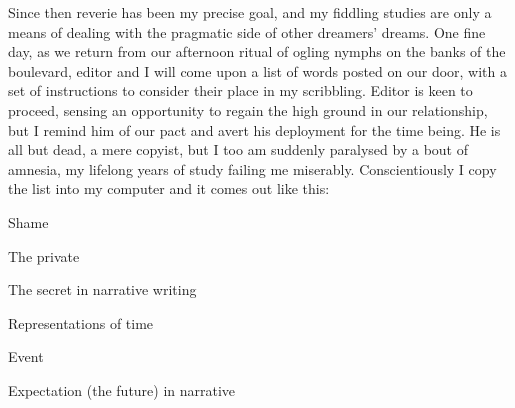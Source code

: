 \documentclass[
]{memoir}
\begin{document}
Since then reverie has been my precise goal, and my fiddling studies are
only a means of dealing with the pragmatic side of other dreamers'
dreams. One fine day, as we return from our afternoon ritual of ogling
nymphs on the banks of the boulevard, editor and I will come upon a list
of words posted on our door, with a set of instructions to consider
their place in my scribbling. Editor is keen to proceed, sensing an
opportunity to regain the high ground in our relationship, but I remind
him of our pact and avert his deployment for the time being. He is all
but dead, a mere copyist, but I too am suddenly paralysed by a bout of
amnesia, my lifelong years of study failing me miserably.
Conscientiously I copy the list into my computer and it comes out like
this:

Shame

The private

The secret in narrative writing

Representations of time

Event

Expectation (the future) in narrative
\end{document}
